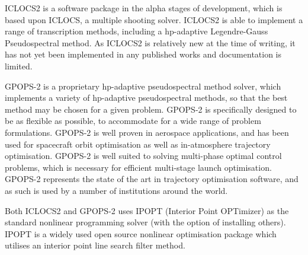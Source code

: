 ICLOCS2 is a software package in the alpha stages of development, which is based upon ICLOCS, a multiple shooting solver\cite{iclocs}. ICLOCS2 is able to implement a range of transcription methods, including a \textsf{hp}-adaptive Legendre-Gauss Pseudospectral method\cite{iclocs}. As ICLOCS2 is relatively new at the time of writing, it has not yet been implemented in any published works and documentation is limited. 

GPOPS-2 is a proprietary \textsf{hp}-adaptive pseudospectral method solver, which implements a variety of \textsf{hp}-adaptive pseudospectral methods, so that the best method may be chosen for a given problem\cite{Rao2010}. GPOPS-2 is specifically designed to be as flexible as possible, to accommodate for a wide range of problem formulations\cite{Rao2010}. GPOPS-2 is well proven in aerospace applications, and has been used for spacecraft orbit optimisation as well as in-atmosphere trajectory optimisation\cite{Rizvi2015,Lipp2014}. GPOPS-2 is well suited to solving multi-phase optimal control problems, which is necessary for efficient multi-stage launch optimisation\cite{Rao2010}. GPOPS-2 represents the state of the art in trajectory optimisation software, and as such is used by a number of institutions around the world. 

Both ICLOCS2 and GPOPS-2 uses IPOPT\cite{Wachter2006} (Interior Point OPTimizer) as the standard nonlinear programming solver (with the option of installing others). IPOPT is a widely used open source nonlinear optimisation package which utilises an interior point line search filter method. 

